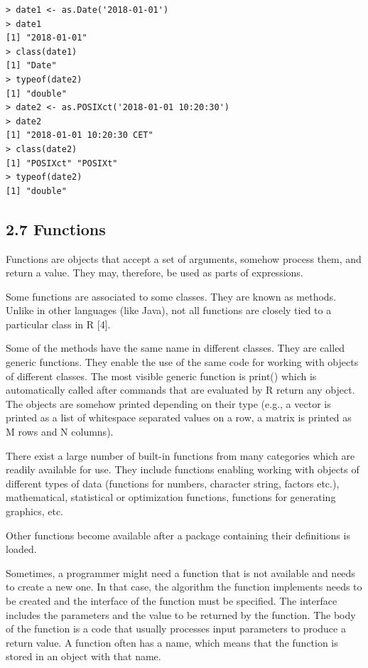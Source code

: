 \documentclass[10pt]{book}
\begin{document}
\begin{verbatim}
> date1 <- as.Date('2018-01-01')
> date1
[1] "2018-01-01"
> class(date1)
[1] "Date"
> typeof(date2)
[1] "double"
> date2 <- as.POSIXct('2018-01-01 10:20:30')
> date2
[1] "2018-01-01 10:20:30 CET"
> class(date2)
[1] "POSIXct" "POSIXt"
> typeof(date2)
[1] "double"
\end{verbatim}

\subsection*{2.7 Functions}
Functions are objects that accept a set of arguments, somehow process them, and return a value. They may, therefore, be used as parts of expressions.

Some functions are associated to some classes. They are known as methods. Unlike in other languages (like Java), not all functions are closely tied to a particular class in R [4].

Some of the methods have the same name in different classes. They are called generic functions. They enable the use of the same code for working with objects of different classes. The most visible generic function is print() which is automatically called after commands that are evaluated by R return any object. The objects are somehow printed depending on their type (e.g., a vector is printed as a list of whitespace separated values on a row, a matrix is printed as M rows and N columns).

There exist a large number of built-in functions from many categories which are readily available for use. They include functions enabling working with objects of different types of data (functions for numbers, character string, factors etc.), mathematical, statistical or optimization functions, functions for generating graphics, etc.

Other functions become available after a package containing their definitions is loaded.

Sometimes, a programmer might need a function that is not available and needs to create a new one. In that case, the algorithm the function implements needs to be created and the interface of the function must be specified. The interface includes the parameters and the value to be returned by the function. The body of the function is a code that usually processes input parameters to produce a return value. A function often has a name, which means that the function is stored in an object with that name.
\end{document}
